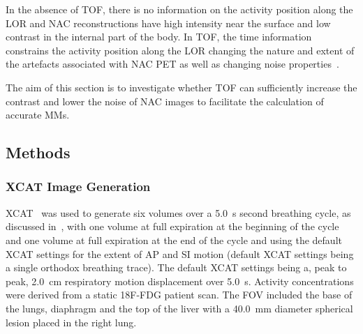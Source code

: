         In the absence of \gls{TOF}, there is no information on the activity position along the \gls{LOR} and \gls{NAC} reconstructions have high intensity near the surface and low contrast in the internal part of the body. In \gls{TOF}, the time information constrains the activity position along the \gls{LOR} changing the nature and extent of the artefacts associated with \gls{NAC} \gls{PET} as well as changing noise properties~\parencite{Ter-Pogossian1981}.
        
        The aim of this section is to investigate whether \gls{TOF} can sufficiently increase the contrast and lower the noise of \gls{NAC} images to facilitate the calculation of accurate \glspl{MM}.
        
        \subsection{Methods} \label{sec:impact_of_tof_on_respiratory_motion_model_estimation_using_pre_gated_no_intra_cycle_motion_nAC_pet_methods}
            \subsubsection{XCAT Image Generation} \label{sec:impact_of_tof_on_respiratory_motion_model_estimation_using_pre_gated_no_intra_cycle_motion_nAC_pet_methods_xcat_image_generation}
                \gls{XCAT}~\parencite{Segars2010} was used to generate six volumes over a \SI{5.0}{\second} second breathing cycle, as discussed in~, with one volume at full expiration at the beginning of the cycle and one volume at full expiration at the end of the cycle and using the default \gls{XCAT} settings for the extent of \gls{AP} and \gls{SI} motion (default \gls{XCAT} settings being a single orthodox breathing trace). The default \gls{XCAT} settings being a, peak to peak, \SI{2.0}{\centi\metre} respiratory motion displacement over \SI{5.0}{\second}. Activity concentrations were derived from a static \gls{18F-FDG} patient scan. The \gls{FOV} included the base of the lungs, diaphragm and the top of the liver with a \SI{40.0}{\milli\metre} diameter spherical lesion placed in the right lung.
            
